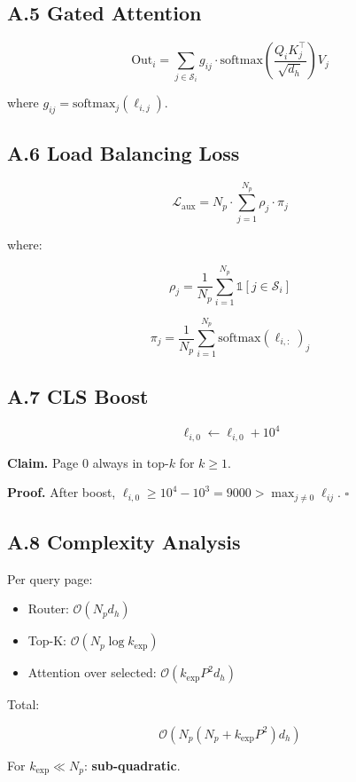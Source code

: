 \subsection{A.5 Gated Attention}

\[
\text{Out}_i = \sum_{j \in \mathcal{S}_i} g_{ij} \cdot \text{softmax}\!\left(\frac{Q_i K_j^\top}{\sqrt{d_h}}\right) V_j
\tag{A.10}
\]

where $g_{ij} = \text{softmax}_j(\ell_{i, j})$.

\subsection{A.6 Load Balancing Loss}

\[
\mathcal{L}_\text{aux} = N_p \cdot \sum_{j=1}^{N_p} \rho_j \cdot \pi_j
\tag{A.11}
\]

where:

\[
\rho_j = \frac{1}{N_p} \sum_{i=1}^{N_p} \mathbb{1}[j \in \mathcal{S}_i]
\tag{A.12}
\]

\[
\pi_j = \frac{1}{N_p} \sum_{i=1}^{N_p} \text{softmax}(\ell_{i, :})_j
\tag{A.13}
\]

\subsection{A.7 CLS Boost}

\[
\ell_{i, 0} \leftarrow \ell_{i, 0} + 10^4
\tag{A.14}
\]

\textbf{Claim.} Page 0 always in top-$k$ for $k \geq 1$.

\textbf{Proof.} After boost, $\ell_{i, 0} \geq 10^4 - 10^3 = 9000 > \max_{j \neq 0} \ell_{ij}$. $\square$

\subsection{A.8 Complexity Analysis}

Per query page:
\begin{itemize}
\item Router: $\mathcal{O}(N_p d_h)$
\item Top-K: $\mathcal{O}(N_p \log k_\text{exp})$
\item Attention over selected: $\mathcal{O}(k_\text{exp} P^2 d_h)$

\end{itemize}
Total:

\[
\mathcal{O}(N_p (N_p + k_\text{exp} P^2) d_h)
\tag{A.15}
\]

For $k_\text{exp} \ll N_p$: \textbf{sub-quadratic}.

